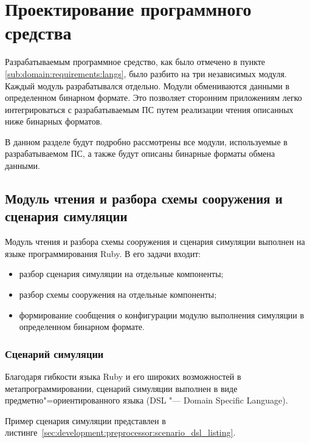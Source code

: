 \section{Проектирование программного средства} %
\label{sec:development}

Разрабатываемым программное средство, как было отмечено в пункте \ref{sub:domain:requirements:langs}, было разбито на три независимых модуля.
Каждый модуль разрабатывался отдельно. Модули обмениваются данными в определенном бинарном формате.
Это позволяет сторонним приложениям легко интегрироваться с разрабатываемым ПС путем реализации чтения описанных ниже бинарных форматов.

В данном разделе будут подробно рассмотрены все модули, используемые в разрабатываемом ПС, а также будут описаны бинарные форматы обмена данными.

\subsection{Модуль чтения и разбора схемы сооружения и сценария симуляции}
\label{sec:development:preprocessor}

Модуль чтения и разбора схемы сооружения и сценария симуляции выполнен на языке программирования Ruby.
В его задачи входит:
\begin{itemize}
  \item разбор сценария симуляции на отдельные компоненты;
  \item разбор схемы сооружения на отдельные компоненты;
  \item формирование сообщения о конфигурации модулю выполнения симуляции в определенном бинарном формате.
\end{itemize}

\subsubsection{Сценарий симуляции}
\label{sec:development:preprocessor:scenario_dsl}

Благодаря гибкости языка Ruby и его широких возможностей в метапрограммировании,
сценарий симуляции выполнен в виде предметно"=ориентированного языка (DSL "--- Domain Specific Language).

Пример сценария симуляции представлен в листинге~\ref{sec:development:preprocessor:scenario_dsl_listing}.



